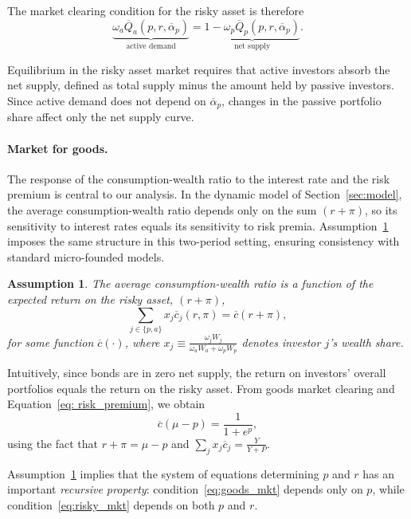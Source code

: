 \documentclass[12pt,english]{article}
\newtheorem{assump}{Assumption}
\begin{document}
The market clearing condition for the risky asset is therefore
\begin{equation}\label{eq:risky_mkt}
    \underbrace{\omega_a \overline{Q}_a(p, r, \overline{\alpha}_p)}_{\text{active demand}} 
    = \underbrace{1 - \omega_p \overline{Q}_p(p, r, \overline{\alpha}_p)}_{\text{net supply}}.
\end{equation}

Equilibrium in the risky asset market requires that active investors absorb the net supply, defined as total supply minus the amount held by passive investors.
Since active demand does not depend on $\overline{\alpha}_p$, changes in the passive portfolio share affect only the net supply curve.

\paragraph{Market for goods.}
The response of the consumption-wealth ratio to the interest rate and the risk premium is central to our analysis.
In the dynamic model of Section~\ref{sec:model}, the average consumption-wealth ratio depends only on the sum $(r+\pi)$, so its sensitivity to interest rates equals its sensitivity to risk premia.
Assumption~\ref{assump:c_w_property} imposes the same structure in this two-period setting, ensuring consistency with standard micro-founded models.

\begin{assump}\label{assump:c_w_property}
    The average consumption-wealth ratio is a function of the expected return on the risky asset, $(r+\pi)$, 
    \[
        \sum_{j\in\{p,a\}} x_j \overline{c}_j(r,\pi) = \overline{c}(r+\pi),
    \]
    for some function $\overline{c}(\cdot)$, where $x_j \equiv \frac{\omega_j W_j}{\omega_a W_a + \omega_p W_p}$ denotes investor $j$’s wealth share.
\end{assump}

Intuitively, since bonds are in zero net supply, the return on investors’ overall portfolios equals the return on the risky asset.
From goods market clearing and Equation~\eqref{eq: risk_premium}, we obtain
\begin{equation}\label{eq:goods_mkt}
    \overline{c}(\mu-p) = \frac{1}{1+e^p},
\end{equation}
using the fact that $r + \pi = \mu - p$ and $\sum_{j} x_j \overline{c}_j = \frac{Y}{Y+P}$.

Assumption~\ref{assump:c_w_property} implies that the system of equations determining $p$ and $r$ has an important \emph{recursive property}: condition~\eqref{eq:goods_mkt} depends only on $p$, while condition~\eqref{eq:risky_mkt} depends on both $p$ and $r$.
\end{document}
